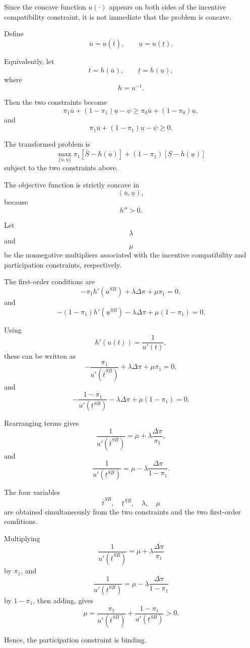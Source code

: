 Since the concave function \(u(\cdot)\) appears on both sides of the incentive compatibility constraint, it is not immediate that the problem is concave.

Define
\[
\overline u=u(\overline t),
\qquad
\underline u=u(\underline t).
\]

Equivalently, let
\[
\overline t=h(\overline u),
\qquad
\underline t=h(\underline u),
\]
where
\[
h=u^{-1}.
\]

Then the two constraints become
\[
\pi_1\overline u
+
(1-\pi_1)\underline u
-
\psi
\ge
\pi_0\overline u
+
(1-\pi_0)\underline u,
\]
and
\[
\pi_1\overline u
+
(1-\pi_1)\underline u
-
\psi
\ge 0.
\]

The transformed problem is
\[
\max_{\{\overline u,\underline u\}}
\pi_1\left[\overline S-h(\overline u)\right]
+
(1-\pi_1)\left[\underline S-h(\underline u)\right]
\]
subject to the two constraints above.

The objective function is strictly concave in
\[
(\overline u,\underline u),
\]
because
\[
h''>0.
\]

Let
\[
\lambda
\]
and
\[
\mu
\]
be the nonnegative multipliers associated with the incentive compatibility and participation constraints, respectively.

The first-order conditions are
\[
-\pi_1h'(\overline u^{SB})
+
\lambda\Delta\pi
+
\mu\pi_1
=
0,
\]
and
\[
-(1-\pi_1)h'(\underline u^{SB})
-
\lambda\Delta\pi
+
\mu(1-\pi_1)
=
0.
\]

Using
\[
h'(u(t))=\frac{1}{u'(t)},
\]
these can be written as
\[
-\frac{\pi_1}{u'(\overline t^{SB})}
+
\lambda\Delta\pi
+
\mu\pi_1
=
0,
\]
and
\[
-\frac{1-\pi_1}{u'(\underline t^{SB})}
-
\lambda\Delta\pi
+
\mu(1-\pi_1)
=
0.
\]

Rearranging terms gives
\[
\frac{1}{u'(\overline t^{SB})}
=
\mu
+
\lambda\frac{\Delta\pi}{\pi_1},
\]
and
\[
\frac{1}{u'(\underline t^{SB})}
=
\mu
-
\lambda\frac{\Delta\pi}{1-\pi_1}.
\]

The four variables
\[
\overline t^{SB},
\quad
\underline t^{SB},
\quad
\lambda,
\quad
\mu
\]
are obtained simultaneously from the two constraints and the two first-order conditions.

Multiplying
\[
\frac{1}{u'(\overline t^{SB})}
=
\mu
+
\lambda\frac{\Delta\pi}{\pi_1}
\]
by \(\pi_1\), and
\[
\frac{1}{u'(\underline t^{SB})}
=
\mu
-
\lambda\frac{\Delta\pi}{1-\pi_1}
\]
by \(1-\pi_1\), then adding, gives
\[
\mu
=
\frac{\pi_1}{u'(\overline t^{SB})}
+
\frac{1-\pi_1}{u'(\underline t^{SB})}
>0.
\]

Hence, the participation constraint is binding.



